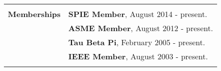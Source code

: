 \documentclass{article}[16pt]
\newlength{\lcolw}
\newlength{\rcolw}
\newlength{\hlcolw}
\begin{document}
%

\begin{tabular}{L{\hlcolw}  L{\rcolw}}
\hline \\
\textbf{\Large Memberships} 
 & \textbf{SPIE Member}, August 2014 - present.
\vspace{0.1in} \\ 
 & \textbf{ASME Member}, August 2012 - present.
\vspace{0.1in} \\ 
 &\textbf{Tau Beta Pi}, February 2005 - present.
\vspace{0.1in} \\ 
 & \textbf{IEEE Member}, August 2003 - present.
\vspace{0.1in} \\ 
\hline \\
\end{tabular}
\end{document}
